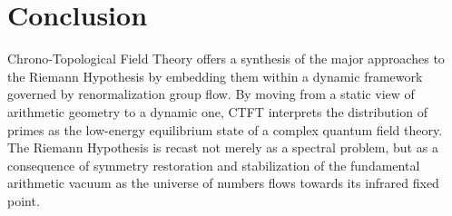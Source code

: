 \documentclass[11pt, a4paper]{article}
\theoremstyle{definition}
\begin{document}
\section{Conclusion}
Chrono-Topological Field Theory offers a synthesis of the major approaches to the Riemann Hypothesis by embedding them within a dynamic framework governed by renormalization group flow. By moving from a static view of arithmetic geometry to a dynamic one, CTFT interprets the distribution of primes as the low-energy equilibrium state of a complex quantum field theory. The Riemann Hypothesis is recast not merely as a spectral problem, but as a consequence of symmetry restoration and stabilization of the fundamental arithmetic vacuum as the universe of numbers flows towards its infrared fixed point.



\end{document}
